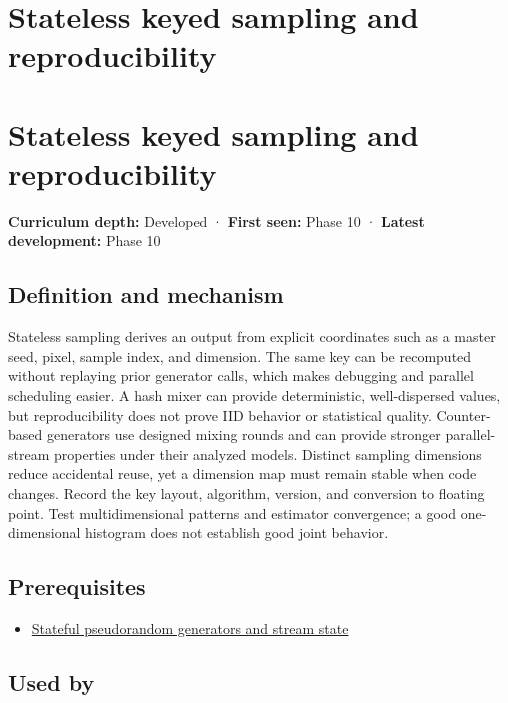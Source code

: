 \hypertarget{appendix-daaf25bfd3a0}{}
\section*{Stateless keyed sampling and reproducibility}
\section{Stateless keyed sampling and reproducibility}\label{stateless-keyed-sampling-and-reproducibility}

\textbf{Curriculum depth:} Developed · \textbf{First seen:} Phase 10 · \textbf{Latest development:} Phase 10

\subsection{Definition and mechanism}\label{definition-and-mechanism}

Stateless sampling derives an output from explicit coordinates such as a master seed, pixel, sample index, and dimension. The same key can be recomputed without replaying prior generator calls, which makes debugging and parallel scheduling easier. A hash mixer can provide deterministic, well-dispersed values, but reproducibility does not prove IID behavior or statistical quality. Counter-based generators use designed mixing rounds and can provide stronger parallel-stream properties under their analyzed models. Distinct sampling dimensions reduce accidental reuse, yet a dimension map must remain stable when code changes. Record the key layout, algorithm, version, and conversion to floating point. Test multidimensional patterns and estimator convergence; a good one-dimensional histogram does not establish good joint behavior.

\subsection{Prerequisites}\label{prerequisites}

\begin{itemize}
\tightlist
\item
  \hyperref[appendix-e0f7c7e08f3a]{Stateful pseudorandom generators and stream state}
\end{itemize}

\subsection{Used by}\label{used-by}


